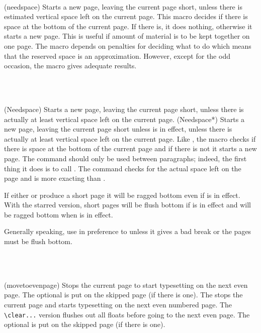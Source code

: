 \begin{syntax}
\cmd{\needspace} \\
\end{syntax}
\glossary(needspace)%
  {}%
  {Starts a new page, leaving the current page short, unless there is 
   estimated  vertical space left on the current page.}
This macro decides if there is  space at the bottom of the 
current page. If there is, it does nothing, otherwise it starts a new page.
This is useful if  amount of material is to be kept together
on one page. The \cmd{\needspace} macro 
depends on penalties for deciding what to do which means that the reserved
space is an approximation. However, except for the odd occasion, the
macro gives adequate results. 

\begin{syntax}
\cmd{\Needspace} \\
\cmd{\Needspace*} \\
\end{syntax}
\glossary(Needspace)%
  {}%
  {Starts a new page, leaving the current page short, unless there is 
   actually at least  vertical space left on the current page. }
\glossary(Needspace*)%
  {}%
  {Starts a new page, leaving the current page short unless  
   is in effect, unless there is 
   actually at least  vertical space left on the current page.}
    Like \cmd{\needspace}, the \cmd{\Needspace} macro checks if there is
 space at the bottom of the current page and if there is not
it starts a new page. The command should only be used between paragraphs;
indeed, the first thing it does is to call . The \cmd{\Needspace}
command checks for the actual space left on the page and is more exacting
than \cmd{\needspace}.

    If either \cmd{\needspace} or \cmd{\Needspace} produce a short page it
will be ragged bottom even if \cmd{\flushbottom} is in effect. With
the starred \cmd{\Needspace*} version, short pages will be flush bottom
if \cmd{\flushbottom} is in effect and will be ragged bottom
when \cmd{\raggedbottom} is in effect.

    Generally speaking, use \cmd{\needspace} in preference to \cmd{\Needspace}
unless it gives a bad break or the pages must be flush bottom.


\begin{syntax}
\cmd{\movetoevenpage} \\
\cmd{\cleartoevenpage} \\
\end{syntax}
\glossary(movetoevenpage)%
  {}%
  {Stops the current page to start typesetting on the next even page.
   The optional  is put on the skipped page (if there is one).}
The \cmd{\movetoevenpage} stops the current page and starts typesetting on the
next even numbered page. The \verb?\clear...? version flushes out all 
floats before
going to the next even page. The optional  is put on the skipped
page (if there is one).

